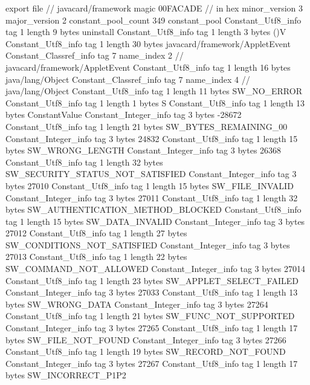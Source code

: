 export file {		// javacard/framework
	magic	00FACADE		 // in hex
	minor_version	3
	major_version	2
	constant_pool_count	349
	constant_pool {
		Constant_Utf8_info {
			tag	1
			length	9
			bytes	uninstall
		}
		Constant_Utf8_info {
			tag	1
			length	3
			bytes	()V
		}
		Constant_Utf8_info {
			tag	1
			length	30
			bytes	javacard/framework/AppletEvent
		}
		Constant_Classref_info {
			tag	7
			name_index	2		// javacard/framework/AppletEvent
		}
		Constant_Utf8_info {
			tag	1
			length	16
			bytes	java/lang/Object
		}
		Constant_Classref_info {
			tag	7
			name_index	4		// java/lang/Object
		}
		Constant_Utf8_info {
			tag	1
			length	11
			bytes	SW_NO_ERROR
		}
		Constant_Utf8_info {
			tag	1
			length	1
			bytes	S
		}
		Constant_Utf8_info {
			tag	1
			length	13
			bytes	ConstantValue
		}
		Constant_Integer_info {
			tag	3
			bytes	-28672
		}
		Constant_Utf8_info {
			tag	1
			length	21
			bytes	SW_BYTES_REMAINING_00
		}
		Constant_Integer_info {
			tag	3
			bytes	24832
		}
		Constant_Utf8_info {
			tag	1
			length	15
			bytes	SW_WRONG_LENGTH
		}
		Constant_Integer_info {
			tag	3
			bytes	26368
		}
		Constant_Utf8_info {
			tag	1
			length	32
			bytes	SW_SECURITY_STATUS_NOT_SATISFIED
		}
		Constant_Integer_info {
			tag	3
			bytes	27010
		}
		Constant_Utf8_info {
			tag	1
			length	15
			bytes	SW_FILE_INVALID
		}
		Constant_Integer_info {
			tag	3
			bytes	27011
		}
		Constant_Utf8_info {
			tag	1
			length	32
			bytes	SW_AUTHENTICATION_METHOD_BLOCKED
		}
		Constant_Utf8_info {
			tag	1
			length	15
			bytes	SW_DATA_INVALID
		}
		Constant_Integer_info {
			tag	3
			bytes	27012
		}
		Constant_Utf8_info {
			tag	1
			length	27
			bytes	SW_CONDITIONS_NOT_SATISFIED
		}
		Constant_Integer_info {
			tag	3
			bytes	27013
		}
		Constant_Utf8_info {
			tag	1
			length	22
			bytes	SW_COMMAND_NOT_ALLOWED
		}
		Constant_Integer_info {
			tag	3
			bytes	27014
		}
		Constant_Utf8_info {
			tag	1
			length	23
			bytes	SW_APPLET_SELECT_FAILED
		}
		Constant_Integer_info {
			tag	3
			bytes	27033
		}
		Constant_Utf8_info {
			tag	1
			length	13
			bytes	SW_WRONG_DATA
		}
		Constant_Integer_info {
			tag	3
			bytes	27264
		}
		Constant_Utf8_info {
			tag	1
			length	21
			bytes	SW_FUNC_NOT_SUPPORTED
		}
		Constant_Integer_info {
			tag	3
			bytes	27265
		}
		Constant_Utf8_info {
			tag	1
			length	17
			bytes	SW_FILE_NOT_FOUND
		}
		Constant_Integer_info {
			tag	3
			bytes	27266
		}
		Constant_Utf8_info {
			tag	1
			length	19
			bytes	SW_RECORD_NOT_FOUND
		}
		Constant_Integer_info {
			tag	3
			bytes	27267
		}
		Constant_Utf8_info {
			tag	1
			length	17
			bytes	SW_INCORRECT_P1P2
}}}
